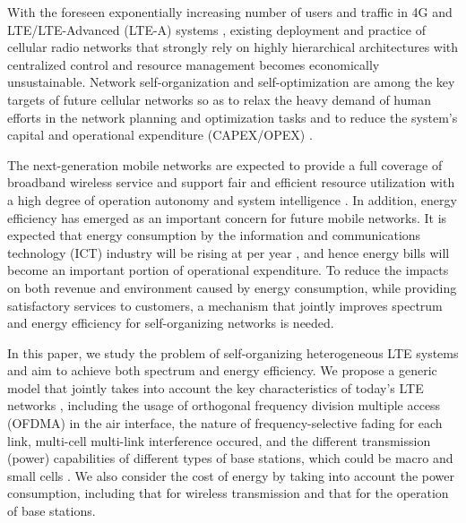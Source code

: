 \documentclass[conference]{IEEEtran}
\begin{document}
With the foreseen exponentially increasing number of users and traffic in 4G and LTE/LTE-Advanced (LTE-A) systems  \cite{3GPP-LTE-A}, existing deployment and practice of cellular radio networks that strongly rely on highly hierarchical architectures with centralized control and resource management becomes economically unsustainable. Network self-organization and self-optimization are among the key targets of future cellular networks so as to relax the heavy demand of human efforts in the network planning and optimization tasks and to reduce the system's capital and operational expenditure (CAPEX/OPEX) \cite{BLTJ10}.

The next-generation mobile networks are expected to provide a full coverage of broadband wireless service and support fair and efficient resource utilization with a high degree of operation autonomy and system intelligence \cite{NGMN}. In addition, energy efficiency has emerged as an important concern for future mobile networks. It is expected that energy consumption by the information and communications technology (ICT) industry will be rising at  per year \cite{GF08}, and hence energy bills will become an important portion of operational expenditure. To reduce the impacts on both revenue and environment caused by energy consumption, while providing satisfactory services to customers, a mechanism that jointly improves spectrum and energy efficiency for self-organizing networks is needed.


In this paper, we study the problem of self-organizing heterogeneous LTE systems and aim to achieve both spectrum and energy efficiency. We propose a generic model that jointly takes into account the key characteristics of today's LTE networks \cite{LTEbook2011}, including the usage of orthogonal frequency division multiple access (OFDMA) in the air interface, the nature of frequency-selective fading for each link, multi-cell multi-link interference occured, and the different transmission (power) capabilities of different types of base stations,
which could be macro and small cells \cite{SC_Forum}. We also consider the cost of energy by taking into account the power consumption, including that for wireless transmission and that for the operation of base stations. 
\end{document}
